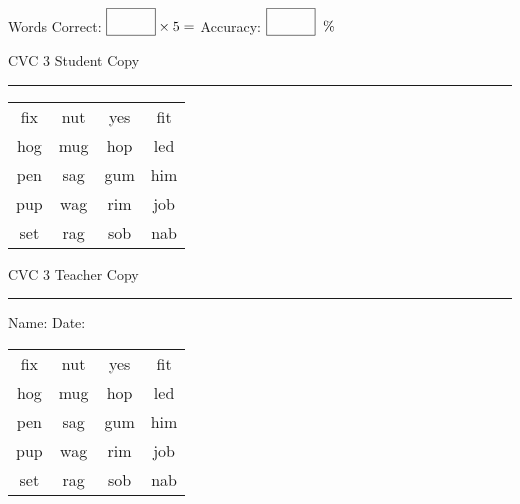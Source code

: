 \documentclass{memoir}
\begin{document}
\normalsize

Words Correct: $\fbox{\phantom{\huge 100}} \times 5 = $ Accuracy: $\fbox{\phantom{\huge 100}}\;\; \%$ 

\vfill

\newpage


\footnotesize \noindent
CVC 3 \hfill Student Copy
\smallskip
\hrule

\huge

\setlength{\tabcolsep}{14pt}
\def\arraystretch{2}

{\selectfont


\begin{vplace}[0.5]
\begin{center}
\begin{tabular}{cccc}
fix & nut & yes & fit \\
hog & mug & hop & led \\
pen & sag & gum  & him \\
pup & wag & rim & job \\
set & rag & sob & nab \\
\end{tabular}
\end{center}
\end{vplace}

}

\newpage

\footnotesize \noindent
CVC 3 \hfill Teacher Copy
\smallskip
\hrule

\normalsize

\vfill

\noindent
Name: \underline{\hspace{1.75in}} \hfill Date: \underline{\hspace{1in}}

\huge

{\selectfont


\begin{vplace}[0.5]
\begin{center}
\begin{tabular}{cccc}
fix & nut & yes & fit \\
hog & mug & hop & led \\
pen & sag & gum  & him \\
pup & wag & rim & job \\
set & rag & sob & nab \\
\end{tabular}
\end{center}
\end{vplace}



}
\end{document}
